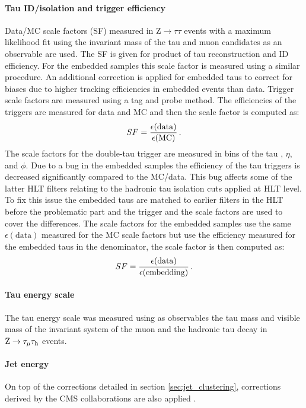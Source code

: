 \paragraph{Tau ID/isolation and trigger efficiency} Data/MC scale factors (SF) measured in $\mathrm{Z}\rightarrow\tau\tau$ events with a maximum likelihood fit using the invariant mass of the tau and muon candidates as an observable are used. The SF is given for product of tau reconstruction and ID efficiency. For the embedded samples this scale factor is measured using a similar procedure. An additional correction is applied for embedded taus to correct for biases due to higher tracking efficiencies in embedded events than data. Trigger scale factors are measured using a tag and probe method. The efficiencies of the triggers are measured for data and MC and then the scale factor is computed as:
\begin{equation}
    SF = \frac{\epsilon(\mathrm{data})}{\epsilon(\mathrm{MC})} \mend
\end{equation}
The scale factors for the double-tau trigger are measured in bins of the tau \pt, $\eta$, and $\phi$. Due to a bug in the embedded samples the efficiency of the tau triggers is decreased significantly compared to the MC/data. This bug affects some of the latter HLT filters relating to the hadronic tau isolation cuts applied at HLT level. To fix this issue the embedded taus are matched to earlier filters in the HLT before the problematic part and the trigger and the scale factors are used to cover the differences. The scale factors for the embedded samples use the same $\epsilon(\mathrm{data})$ measured for the MC scale factors but use the efficiency measured for the embedded taus in the denominator, the scale factor is then computed as:
\begin{equation}
    SF = \frac{\epsilon(\mathrm{data})}{\epsilon(\mathrm{embedding})} \mend
\end{equation}

\paragraph{Tau energy scale} The tau energy scale was measured using as observables the tau mass and visible mass of the invariant system of the muon and the hadronic tau decay in $\mathrm{Z}\rightarrow\tau_{\mu}\tau_{\rm h}$ events. 

\paragraph{Jet energy} On top of the corrections detailed in section \ref{sec:jet_clustering}, corrections derived by the CMS collaborations are also applied \cite{collaboration_2011}.

